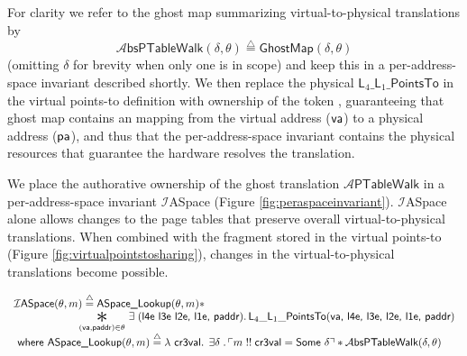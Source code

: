 For clarity we refer to the ghost map summarizing virtual-to-physical translations by 
\[\mathcal{A}\textsf{bsPTableWalk}(\delta,\theta) \stackrel{\triangle}{=} \mathsf{GhostMap}(\delta,\theta)\]
(omitting $\delta$ for brevity when only one is in scope)
and keep this in a per-address-space invariant described shortly.
We then replace the physical
 $\textsf{L}_{4}\_\textsf{L}_{1}\_\textsf{PointsTo}$ in the virtual points-to definition
with ownership of the token , %
guaranteeing that ghost map contains an mapping from the virtual address ($\mathsf{va}$) to a physical address ($\textsf{pa}$),
and thus that the per-address-space invariant contains the physical resources that guarantee the hardware resolves the translation.

We place the authorative ownership of the ghost translation $\mathcal{A}\textsf{PTableWalk}$ in a per-address-space invariant
$\mathcal{I}$\textsf{ASpace} (Figure \ref{fig:peraspaceinvariant}). 
$\mathcal{I}$\textsf{ASpace} alone allows changes to the page tables 
that preserve overall virtual-to-physical translations.
When combined with the
fragment stored in the virtual points-to (Figure \ref{fig:virtualpointstosharing}),
changes in the virtual-to-physical translations become possible.

  \begin{figure*}
  \footnotesize
\[
\begin{array}{l}
  \mathcal{I}\textsf{ASpace}(\ptablestore,m)\stackrel{\triangle}{=} \textsf{ASpace\_Lookup}(\ptablestore,m) \ast \\
 \qquad\qquad\qquad \bigast{(\vaddr, \textsf{paddr})\in \ptablestore}{\exists\;(\textsf{l4e l3e l2e, l1e, paddr})\ldotp \textsf{L}_{4}\_\textsf{L}_{1}\_\textsf{PointsTo}(\vaddr\textsf{, l4e, l3e, l2e, l1e, paddr})} \\
  \textsf{ where } 
   \textsf{ASpace\_Lookup} (\ptablestore,m) \stackrel{\triangle}{=} \lambda\textsf{ cr3val} \ldotp \; \exists \gammaPred \; \ldotp \ulcorner m \; !!\; \textsf{cr3val} = \textsf{Some } \gammaPred \urcorner \ast
    \ptableabswalk{\delta,\theta}
  
\end{array}
\]
\vspace{-1em}
\caption{Global Address-Space Invariant with a fixed global map of address-space names $m$}
  \label{fig:peraspaceinvariant}
  \end{figure*}

